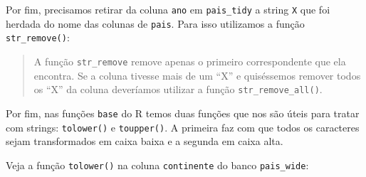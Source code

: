 \documentclass[]{book}
\newenvironment{Shaded}{\begin{snugshade}}{\end{snugshade}}
\newcommand{\KeywordTok}[1]{\textcolor[rgb]{0.13,0.29,0.53}{\textbf{#1}}}
\newcommand{\NormalTok}[1]{#1}
\newcommand{\OperatorTok}[1]{\textcolor[rgb]{0.81,0.36,0.00}{\textbf{#1}}}
\newcommand{\StringTok}[1]{\textcolor[rgb]{0.31,0.60,0.02}{#1}}
\theoremstyle{definition}
\theoremstyle{definition}
\theoremstyle{definition}
\theoremstyle{remark}
\begin{document}
\begin{Shaded}
\end{Shaded}

Por fim, precisamos retirar da coluna \texttt{ano} em \texttt{pais\_tidy} a string \texttt{X} que foi herdada do nome das colunas de \texttt{pais}. Para isso utilizamos a função \texttt{str\_remove()}:

\begin{Shaded}
\end{Shaded}

\begin{quote}
A função \texttt{str\_remove} remove apenas o primeiro correspondente que ela encontra. Se a coluna tivesse mais de um ``X'' e quiséssemos remover todos os ``X'' da coluna deveríamos utilizar a função \texttt{str\_remove\_all()}.
\end{quote}

Por fim, nas funções \texttt{base} do R temos duas funções que nos são úteis para tratar com strings: \texttt{tolower()} e \texttt{toupper()}. A primeira faz com que todos os caracteres sejam transformados em caixa baixa e a segunda em caixa alta.

Veja a função \texttt{tolower()} na coluna \texttt{continente} do banco \texttt{pais\_wide}:

\begin{Shaded}
\end{Shaded}
\end{document}
